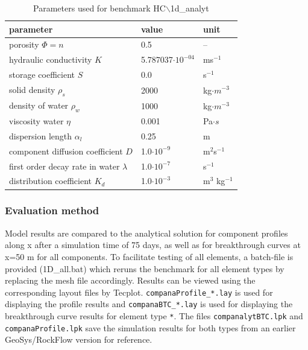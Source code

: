 


\begin{table}[htbp]
\caption{Parameters used for benchmark HC$\backslash$1d\_analyt }
\centering
\begin{tabular}{|l|l|l|}
\hline
parameter & value & unit \\
\hline
porosity $\Phi = n $  & 0.5 &  --  \\			
\hline
hydraulic conductivity $K$ & 5.787037$\cdot 10^{-04}$ & ms$^{-1}$ \\
\hline
storage coefficient $S$ & 0.0 & s$^{-1}$ \\
\hline
solid density $\rho_s$ & 2000 &  kg$\cdot m^{-3}$ \\
\hline
density of water $\rho_w$ & 1000 & kg$\cdot m^{-3}$ \\
\hline
viscosity water $\eta$ & 0.001 & Pa$\cdot s$ \\
\hline
dispersion length $\alpha_l$ & 0.25 & m \\
\hline
component diffusion coefficient $D$ & 1.0$\cdot 10^{-9}$ & m$^2$s$^{-1}$ \\
\hline
first order decay rate in water $\lambda$ & 1.0$\cdot 10^{-7}$ & s$^{-1}$ \\
\hline
distribution coefficient $K_d$ & 1.0$\cdot 10^{-3}$ & m$^3$ kg$^{-1}$ \\
\hline
\end{tabular}
\label{l_tab_benchmark_1d}
\end{table}


\subsubsection*{Evaluation method}
Model results are compared to the analytical solution for component profiles along x after a simulation time of 75 days, as well as for breakthrough curves at x=50 m for all components. To facilitate testing of all elements, a batch-file is provided (1D\_all.bat) which reruns the benchmark for all element types by replacing the mesh file accordingly. Results can be viewed using the corresponding layout files by Tecplot. \texttt{companaProfile\_*.lay} is used for displaying the profile results and \texttt{companaBTC\_*.lay} is used for displaying the breakthrough curve results for element type \texttt{*}. The files \texttt{companalytBTC.lpk} and \texttt{companaProfile.lpk} save the simulation results for both types from an earlier GeoSys/RockFlow version for reference.


